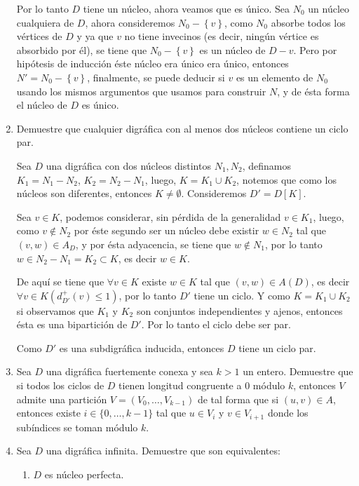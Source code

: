 \documentclass{article}
\newcommand{\set}[1]{\left\{ #1 \right\}}
\begin{document}
\begin{enumerate}
    Por lo tanto $D$ tiene un núcleo, ahora veamos que es único. Sea $N_0$ un núcleo cualquiera de $D$, ahora consideremos $N_0-\set{v}$, como $N_0$ absorbe todos los vértices de $D$ y ya que $v$ no tiene invecinos (es decir, ningún vértice es absorbido por él), se tiene que $N_0-\set{v}$ es un núcleo de $D-v$. Pero por hipótesis de inducción éste núcleo era único era único, entonces $N'=N_0-\set{v}$, finalmente, se puede deducir si $v$ es un elemento de $N_0$ usando los mismos argumentos que usamos para construir $N$, y de ésta forma el núcleo de $D$ es único.
  \item Demuestre que cualquier digr\'afica con al menos dos n\'ucleos
    contiene un ciclo par.

    Sea $D$ una digráfica con dos núcleos distintos $N_1,N_2$, definamos $K_1=N_1-N_2$, $K_2=N_2-N_1$, luego, $K=K_1\cup K_2$, notemos que como los núcleos son diferentes, entonces $K\neq\emptyset$. Consideremos $D'=D[K]$.

    Sea $v\in K$, podemos considerar, sin pérdida de la generalidad $v\in K_1$, luego, como $v\notin N_2$ por éste segundo ser un núcleo debe existir $w\in N_2$ tal que $(v,w)\in A_D$, y por ésta adyacencia, se tiene que $w\notin N_1$, por lo tanto $w\in N_2-N_1=K_2\subset K$, es decir $w\in K$.

    De aquí se tiene que $\forall v\in K$ existe $w\in K$ tal que $(v,w)\in A(D)$, es decir $\forall v\in K (d^+_{D'}(v)\leq 1)$, por lo tanto $D'$ tiene un ciclo. Y como $K=K_1\cup K_2$ si observamos que $K_1$ y $K_2$ son conjuntos independientes y ajenos, entonces ésta es una bipartición de $D'$. Por lo tanto el ciclo debe ser par.

    Como $D'$ es una subdigráfica inducida, entonces $D$ tiene un ciclo par.

  \item Sea $D$ una digr\'afica fuertemente conexa y sea $k > 1$ un entero.
    Demuestre que si todos los ciclos de $D$ tienen longitud congruente a
    $0$ m\'odulo $k$, entonces $V$ admite una partici\'on $V = (V_0, \dots,
    V_{k-1})$ de tal forma que si $(u,v) \in A$, entonces existe $i \in
    \{ 0, \dots, k-1 \}$ tal que $u \in V_i$ y $v \in V_{i+1}$ donde los
    sub\'indices se toman m\'odulo $k$.

  \item Sea $D$ una digr\'afica infinita.  Demuestre que son equivalentes:
    \begin{enumerate}
      \item $D$ es n\'ucleo perfecta.


\end{enumerate}
\end{enumerate}
\end{document}
